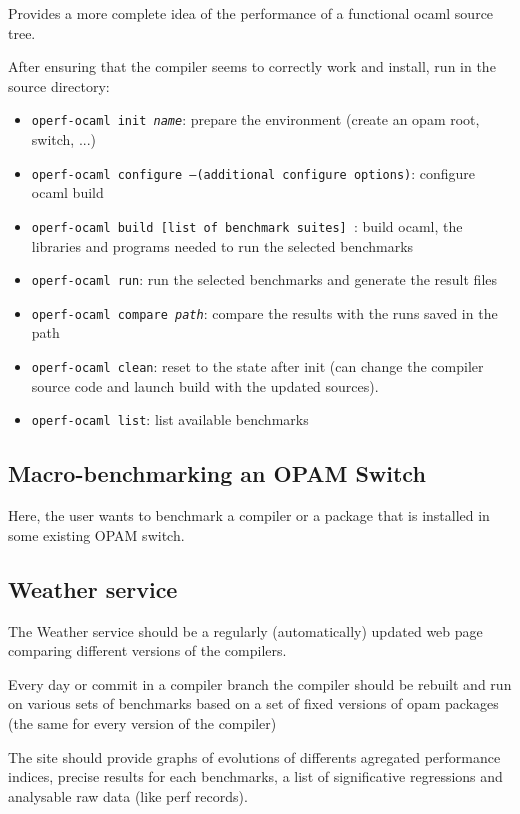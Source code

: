 \documentclass[11pt,a4paper]{article}
\begin{document}
Provides a more complete idea of the performance of a functional
ocaml source tree.

After ensuring that the compiler seems to correctly work and install,
run in the source directory:

\begin{itemize}
\item {\tt operf-ocaml init {\em name}}: prepare the environment (create an opam root, switch, ...)
\item {\tt operf-ocaml configure  --(additional configure options)}: configure ocaml build
\item {\tt operf-ocaml build [list of benchmark suites] }: build ocaml, the
  libraries and programs needed to run the selected benchmarks
\item {\tt operf-ocaml run}: run the selected benchmarks and generate the result files
\item {\tt operf-ocaml compare {\em path}}: compare the results with the runs saved in the path
\item {\tt operf-ocaml clean}: reset to the state after init (can change the compiler source code and launch build with the updated sources).
\item {\tt operf-ocaml list}: list available benchmarks
\end{itemize}

\subsection{Macro-benchmarking an OPAM Switch}

Here, the user wants to benchmark a compiler or a package that is
installed in some existing OPAM switch.

\subsection{Weather service}

The Weather service should be a regularly (automatically) updated web
page comparing different versions of the compilers.

Every day or commit in a compiler branch the compiler should be
rebuilt and run on various sets of benchmarks based on a set of fixed
versions of opam packages (the same for every version of the compiler)

The site should provide graphs of evolutions of differents agregated
performance indices, precise results for each benchmarks, a list of
significative regressions and analysable raw data (like perf records).
\end{document}
